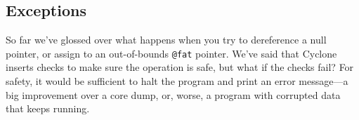 

\subsection{Exceptions}

So far we've glossed over what happens when you try to dereference a
null pointer, or assign to an out-of-bounds \texttt{@fat} pointer.
We've said that Cyclone inserts checks to make sure the operation is
safe, but what if the checks fail?  For safety, it would be sufficient
to halt the program and print an error message---a big improvement
over a core dump, or, worse, a program with corrupted data that keeps
running.

